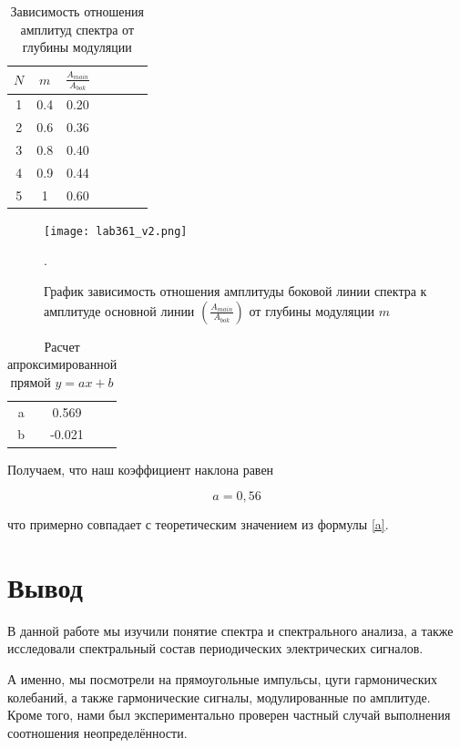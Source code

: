\documentclass[a4paper, 14pt]{extarticle}%
\begin{document}
  	
  	\begin{table}[h]
  		\caption{Зависимость отношения амплитуд спектра от глубины модуляции}
  		\begin{center}
  			\begin{tabular}{|c|c|c|c|c|c|c|}
  				\hline
  				$ N $  & $ m $ & $ \frac{A_{main}}{A_{bok}} $\\
  				\hline
  			1 & 0.4 & 0.20  \\
  				\hline
  			2 & 0.6 & 0.36  \\
  				\hline
  			3 & 0.8 & 0.40  \\
  				\hline
  			4 & 0.9 & 0.44  \\
  				\hline
  			5 & 1 & 0.60     \\
  				\hline
  			\end{tabular}
  		\end{center}
  		\label{C_table}
  	\end{table}
  	
  	\begin{figure}[h!]
  		\label{C_g}
  		\texttt{[image: lab361\_v2.png]}
  		\caption{График зависимость отношения амплитуды боковой линии спектра к амплитуде основной линии $ \left( \frac{A_{main}}{A_{bok}}  \right ) $ от глубины модуляции $ m $}. 
  	\end{figure}
  	
  	\begin{table}[h!]
  		\centering
  		\caption{Расчет апроксимированной прямой $ y = ax +b $}
  		\begin{tabular}{c|cc}
  			\text{} & \text{Estimate} & \\
  			\hline
  			a & 0.569 & \\
  			b & -0.021 &  \\
  		\end{tabular}
  	\end{table}
  	
  	Получаем, что наш коэффициент наклона равен
  	
  	\begin{equation}\label{}
  	 a = 0,56 
  	\end{equation}
  	
  	 что примерно совпадает с теоретическим значением из формулы \eqref{a}. 
  	
  	\section{Вывод}
  	
  	В данной работе мы изучили понятие спектра и спектрального анализа, а также исследовали спектральный состав периодических электрических сигналов. 
  	
  	А именно, мы посмотрели на прямоугольные импульсы, цуги гармонических колебаний, а также гармонические сигналы, модулированные по амплитуде. Кроме того, нами был экспериментально проверен частный случай выполнения соотношения неопределённости. 
  
\end{document}
